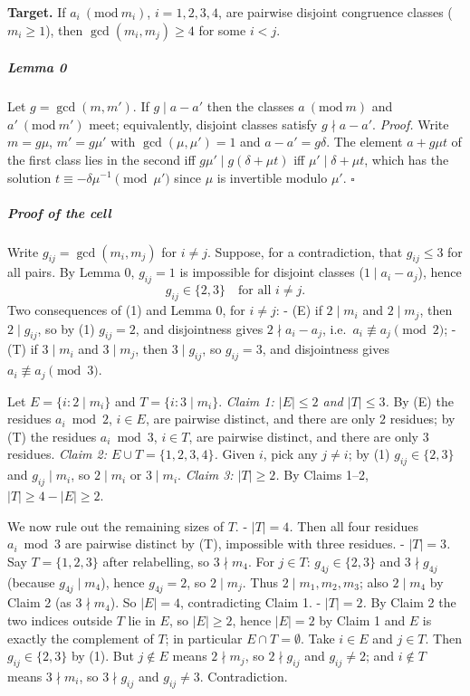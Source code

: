 \documentclass[11pt,a4paper]{article}
\begin{document}
\textbf{Target.} If \(a_i\ (\mathrm{mod}\ m_i)\), \(i=1,2,3,4\), are
pairwise disjoint congruence classes (\(m_i\ge1\)), then
\(\gcd(m_i,m_j)\ge4\) for some \(i<j\).

\subparagraph{Lemma 0}\label{lemma-0}

Let \(g=\gcd(m,m')\). If \(g\mid a-a'\) then the classes
\(a\ (\mathrm{mod}\ m)\) and \(a'\ (\mathrm{mod}\ m')\) meet;
equivalently, disjoint classes satisfy \(g\nmid a-a'\). \emph{Proof.}
Write \(m=g\mu\), \(m'=g\mu'\) with \(\gcd(\mu,\mu')=1\) and
\(a-a'=g\delta\). The element \(a+g\mu t\) of the first class lies in
the second iff \(g\mu'\mid g(\delta+\mu t)\) iff
\(\mu'\mid\delta+\mu t\), which has the solution
\(t\equiv-\delta\mu^{-1}\pmod{\mu'}\) since \(\mu\) is invertible modulo
\(\mu'\). \(\square\)

\subparagraph{Proof of the cell}\label{proof-of-the-cell}

Write \(g_{ij}=\gcd(m_i,m_j)\) for \(i\ne j\). Suppose, for a
contradiction, that \(g_{ij}\le3\) for all pairs. By Lemma 0,
\(g_{ij}=1\) is impossible for disjoint classes (\(1\mid a_i-a_j\)),
hence \[g_{ij}\in\{2,3\}\quad\text{for all } i\ne j.\tag{1}\] Two
consequences of (1) and Lemma 0, for \(i\ne j\): - (E) if \(2\mid m_i\)
and \(2\mid m_j\), then \(2\mid g_{ij}\), so by (1) \(g_{ij}=2\), and
disjointness gives \(2\nmid a_i-a_j\), i.e.~\(a_i\not\equiv a_j\pmod2\);
- (T) if \(3\mid m_i\) and \(3\mid m_j\), then \(3\mid g_{ij}\), so
\(g_{ij}=3\), and disjointness gives \(a_i\not\equiv a_j\pmod3\).

Let \(E=\{i: 2\mid m_i\}\) and \(T=\{i:3\mid m_i\}\). \emph{Claim 1:
\(|E|\le2\) and \(|T|\le3\).} By (E) the residues \(a_i\bmod2\),
\(i\in E\), are pairwise distinct, and there are only \(2\) residues; by
(T) the residues \(a_i\bmod3\), \(i\in T\), are pairwise distinct, and
there are only \(3\) residues. \emph{Claim 2: \(E\cup T=\{1,2,3,4\}\).}
Given \(i\), pick any \(j\ne i\); by (1) \(g_{ij}\in\{2,3\}\) and
\(g_{ij}\mid m_i\), so \(2\mid m_i\) or \(3\mid m_i\). \emph{Claim 3:
\(|T|\ge2\).} By Claims 1--2, \(|T|\ge4-|E|\ge2\).

We now rule out the remaining sizes of \(T\). - \emph{\(|T|=4\).} Then
all four residues \(a_i\bmod 3\) are pairwise distinct by (T),
impossible with three residues. - \emph{\(|T|=3\).} Say \(T=\{1,2,3\}\)
after relabelling, so \(3\nmid m_4\). For \(j\in T\):
\(g_{4j}\in\{2,3\}\) and \(3\nmid g_{4j}\) (because \(g_{4j}\mid m_4\)),
hence \(g_{4j}=2\), so \(2\mid m_j\). Thus \(2\mid m_1,m_2,m_3\); also
\(2\mid m_4\) by Claim 2 (as \(3\nmid m_4\)). So \(|E|=4\),
contradicting Claim 1. - \emph{\(|T|=2\).} By Claim 2 the two indices
outside \(T\) lie in \(E\), so \(|E|\ge2\), hence \(|E|=2\) by Claim 1
and \(E\) is exactly the complement of \(T\); in particular
\(E\cap T=\emptyset\). Take \(i\in E\) and \(j\in T\). Then
\(g_{ij}\in\{2,3\}\) by (1). But \(j\notin E\) means \(2\nmid m_j\), so
\(2\nmid g_{ij}\) and \(g_{ij}\ne2\); and \(i\notin T\) means
\(3\nmid m_i\), so \(3\nmid g_{ij}\) and \(g_{ij}\ne3\). Contradiction.
\end{document}
